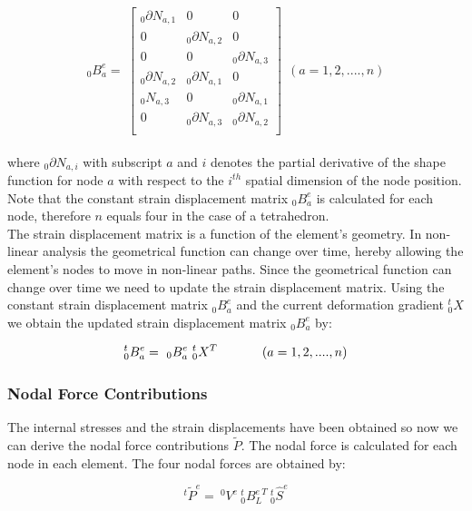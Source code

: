 \begin{equation}
_0B^{e}_{a} = \
\begin{bmatrix} 
  _0\partial N_{a,1} & 0 & 0 \\
  0 & _0\partial N_{a,2} & 0 \\
  0 & 0 & _0\partial N_{a,3} \\
  _0\partial N_{a,2} & _0\partial N_{a,1} & 0 \\
  _0N_{a,3} & 0 & _0\partial N_{a,1} \\
  0 & _0\partial N_{a,3} & _0\partial N_{a,2} \\
\end{bmatrix} 
\ \ (a = 1,2,....,n)
\end{equation} \\

where $_0\partial N_{a,i}$ with subscript $a$ and $i$ denotes the partial
derivative of the shape function for node $a$ with respect to the
$i^{th}$ spatial dimension of the node position. Note
that the constant strain displacement matrix $_0B^{e}_{a}$ is
calculated for each node, therefore $n$ equals four in the case of
a tetrahedron.\\  

The strain displacement matrix is a function of the element's geometry. In
non-linear analysis the geometrical function can change over time,
hereby allowing the element's nodes to move in non-linear paths.
Since the geometrical function can change over time we need to update
the strain displacement matrix. Using the constant strain displacement
matrix $_0B^{e}_{a}$ and the current deformation gradient
$^t_0X$ we obtain the updated strain displacement matrix
$_0B^{e}_{a}$ by:

\begin{equation}
\label{eq:strain-displacement-updated}
^t_0B^{e}_{a} = \ _0B^{e}_{a} \ ^t_0X^T
\hspace{10mm} \ \ (a = 1,2,....,n)
\end{equation}

\subsubsection*{Nodal Force Contributions}
\label{sec:nodal_force_contributions}
The internal stresses and the strain displacements have been obtained so
now we can derive the nodal force contributions $\tilde{P}$. The nodal force is
calculated for each node in each element. The four nodal
forces are obtained by: 

\begin{equation}
\label{eq:force_contributions}
^t\tilde{P}^{e} = \ ^0V^{e} \ ^t_0B^{e \ T}_L \ ^t_0\hat{S}^{e}
\end{equation}

